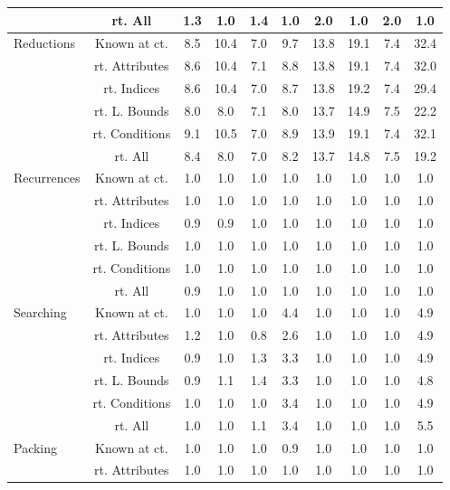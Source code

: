\documentclass{article}
\begin{document}
\begin{longtable}{|p{2cm}||c|c|c|c|c|c|c|c|c|}
 & rt. All & 1.3 & 1.0 & 1.4 & 1.0 & 2.0 & 1.0 & 2.0 & 1.0\\ \cline{2-10}
\hline
\multirow{6}{*}{ \parbox{2cm}{Reductions}} & Known at ct. & 8.5 & 10.4 & 7.0 & 9.7 & 13.8 & 19.1 & 7.4 & 32.4\\ \cline{2-10}
 & rt. Attributes & 8.6 & 10.4 & 7.1 & 8.8 & 13.8 & 19.1 & 7.4 & 32.0\\ \cline{2-10}
 & rt. Indices & 8.6 & 10.4 & 7.0 & 8.7 & 13.8 & 19.2 & 7.4 & 29.4\\ \cline{2-10}
 & rt. L. Bounds & 8.0 & 8.0 & 7.1 & 8.0 & 13.7 & 14.9 & 7.5 & 22.2\\ \cline{2-10}
 & rt. Conditions & 9.1 & 10.5 & 7.0 & 8.9 & 13.9 & 19.1 & 7.4 & 32.1\\ \cline{2-10}
 & rt. All & 8.4 & 8.0 & 7.0 & 8.2 & 13.7 & 14.8 & 7.5 & 19.2\\ \cline{2-10}
\hline
\multirow{6}{*}{ \parbox{2cm}{Recurrences}} & Known at ct. & 1.0 & 1.0 & 1.0 & 1.0 & 1.0 & 1.0 & 1.0 & 1.0\\ \cline{2-10}
 & rt. Attributes & 1.0 & 1.0 & 1.0 & 1.0 & 1.0 & 1.0 & 1.0 & 1.0\\ \cline{2-10}
 & rt. Indices & 0.9 & 0.9 & 1.0 & 1.0 & 1.0 & 1.0 & 1.0 & 1.0\\ \cline{2-10}
 & rt. L. Bounds & 1.0 & 1.0 & 1.0 & 1.0 & 1.0 & 1.0 & 1.0 & 1.0\\ \cline{2-10}
 & rt. Conditions & 1.0 & 1.0 & 1.0 & 1.0 & 1.0 & 1.0 & 1.0 & 1.0\\ \cline{2-10}
 & rt. All & 0.9 & 1.0 & 1.0 & 1.0 & 1.0 & 1.0 & 1.0 & 1.0\\ \cline{2-10}
\hline
\multirow{6}{*}{ \parbox{2cm}{Searching}} & Known at ct. & 1.0 & 1.0 & 1.0 & 4.4 & 1.0 & 1.0 & 1.0 & 4.9\\ \cline{2-10}
 & rt. Attributes & 1.2 & 1.0 & 0.8 & 2.6 & 1.0 & 1.0 & 1.0 & 4.9\\ \cline{2-10}
 & rt. Indices & 0.9 & 1.0 & 1.3 & 3.3 & 1.0 & 1.0 & 1.0 & 4.9\\ \cline{2-10}
 & rt. L. Bounds & 0.9 & 1.1 & 1.4 & 3.3 & 1.0 & 1.0 & 1.0 & 4.8\\ \cline{2-10}
 & rt. Conditions & 1.0 & 1.0 & 1.0 & 3.4 & 1.0 & 1.0 & 1.0 & 4.9\\ \cline{2-10}
 & rt. All & 1.0 & 1.0 & 1.1 & 3.4 & 1.0 & 1.0 & 1.0 & 5.5\\ \cline{2-10}
\hline
\multirow{6}{*}{ \parbox{2cm}{Packing}} & Known at ct. & 1.0 & 1.0 & 1.0 & 0.9 & 1.0 & 1.0 & 1.0 & 1.0\\ \cline{2-10}
 & rt. Attributes & 1.0 & 1.0 & 1.0 & 1.0 & 1.0 & 1.0 & 1.0 & 1.0\\ \cline{2-10}

\end{longtable}
\end{document}
